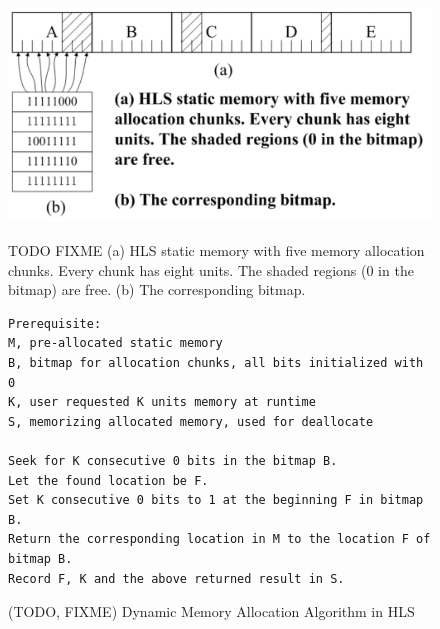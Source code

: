 \documentclass[conference]{IEEEtran}
\begin{document}
\begin{figure}[htb]\centering
    \includegraphics[scale=0.3]{bitmap}\\
    \caption{TODO FIXME (a) HLS static memory with five memory allocation chunks. Every chunk has eight units. The shaded regions (0 in the bitmap) are free. (b) The corresponding bitmap.}    \label{fig_bitmap}
\end{figure}

\begin{figure}[htb]\centering
{\fontsize{6}{6}\selectfont
\begin{lstlisting}[frame=lines]
Prerequisite:
M, pre-allocated static memory
B, bitmap for allocation chunks, all bits initialized with 0
K, user requested K units memory at runtime
S, memorizing allocated memory, used for deallocate

Seek for K consecutive 0 bits in the bitmap B.
Let the found location be F.
Set K consecutive 0 bits to 1 at the beginning F in bitmap B.
Return the corresponding location in M to the location F of bitmap B.
Record F, K and the above returned result in S.
\end{lstlisting}
}
\caption{(TODO, FIXME) Dynamic Memory Allocation Algorithm in HLS}\label{algorithm_hls_malloc}
\end{figure}


\end{document}
